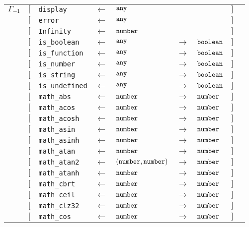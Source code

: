 \begin{tabular}[fragile]{lllllllll}
$\Gamma_{-1}$
& $[$ & \texttt{display}      & $\leftarrow$  & $\texttt{any}$ & & & $]$ \\
& $[$ & \texttt{error}      & $\leftarrow$  & $\texttt{any}$ & & & $]$ \\
& $[$ & \texttt{Infinity}      & $\leftarrow$  & $\texttt{number}$ & & & $]$ \\
& $[$ & \texttt{is\_boolean}   & $\leftarrow$  & $\texttt{any}$ & $\rightarrow$ & $\texttt{boolean}$ & $]$ \\
& $[$ & \texttt{is\_function}  & $\leftarrow$  & $\texttt{any}$ & $\rightarrow$ & $\texttt{boolean}$ & $]$ \\
& $[$ & \texttt{is\_number}    & $\leftarrow$  & $\texttt{any}$ & $\rightarrow$ & $\texttt{boolean}$ & $]$ \\
& $[$ & \texttt{is\_string}    & $\leftarrow$  & $\texttt{any}$ & $\rightarrow$ & $\texttt{boolean}$ & $]$ \\
& $[$ & \texttt{is\_undefined} & $\leftarrow$  & $\texttt{any}$ & $\rightarrow$ & $\texttt{boolean}$ & $]$ \\
& $[$ & \texttt{math\_abs} & $\leftarrow$  & $\texttt{number}$ & $\rightarrow$ & $\texttt{number}$ & $]$ \\
& $[$ & \texttt{math\_acos} & $\leftarrow$  & $\texttt{number}$ & $\rightarrow$ & $\texttt{number}$ & $]$ \\
& $[$ & \texttt{math\_acosh} & $\leftarrow$  & $\texttt{number}$ & $\rightarrow$ & $\texttt{number}$ & $]$ \\
& $[$ & \texttt{math\_asin} & $\leftarrow$  & $\texttt{number}$ & $\rightarrow$ & $\texttt{number}$ & $]$ \\
& $[$ & \texttt{math\_asinh} & $\leftarrow$  & $\texttt{number}$ & $\rightarrow$ & $\texttt{number}$ & $]$ \\
& $[$ & \texttt{math\_atan} & $\leftarrow$  & $\texttt{number}$ & $\rightarrow$ & $\texttt{number}$ & $]$ \\
& $[$ & \texttt{math\_atan2} & $\leftarrow$  & $(\texttt{number}, \texttt{number})$ & $\rightarrow$ & $\texttt{number}$ & $]$ \\
& $[$ & \texttt{math\_atanh} & $\leftarrow$  & $\texttt{number}$ & $\rightarrow$ & $\texttt{number}$ & $]$ \\
& $[$ & \texttt{math\_cbrt} & $\leftarrow$  & $\texttt{number}$ & $\rightarrow$ & $\texttt{number}$ & $]$ \\
& $[$ & \texttt{math\_ceil} & $\leftarrow$  & $\texttt{number}$ & $\rightarrow$ & $\texttt{number}$ & $]$ \\
& $[$ & \texttt{math\_clz32} & $\leftarrow$  & $\texttt{number}$ & $\rightarrow$ & $\texttt{number}$ & $]$ \\
& $[$ & \texttt{math\_cos} & $\leftarrow$  & $\texttt{number}$ & $\rightarrow$ & $\texttt{number}$ & $]$ \\

\end{tabular}
